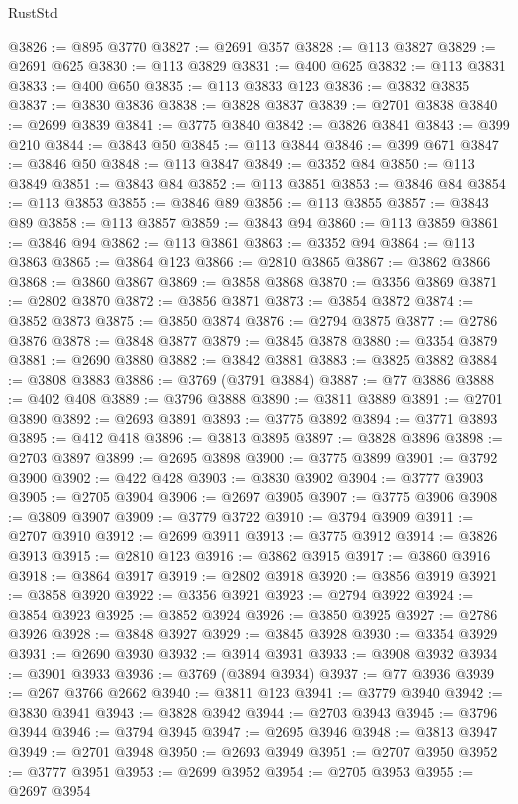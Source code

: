 \begin{lexlean}{RustStd}
\begin{coremodule}
@3826 := @895 @3770
@3827 := @2691 @357
@3828 := @113 @3827
@3829 := @2691 @625
@3830 := @113 @3829
@3831 := @400 @625
@3832 := @113 @3831
@3833 := @400 @650
@3835 := @113 @3833 @123
@3836 := @3832 @3835
@3837 := @3830 @3836
@3838 := @3828 @3837
@3839 := @2701 @3838
@3840 := @2699 @3839
@3841 := @3775 @3840
@3842 := @3826 @3841
@3843 := @399 @210
@3844 := @3843 @50
@3845 := @113 @3844
@3846 := @399 @671
@3847 := @3846 @50
@3848 := @113 @3847
@3849 := @3352 @84
@3850 := @113 @3849
@3851 := @3843 @84
@3852 := @113 @3851
@3853 := @3846 @84
@3854 := @113 @3853
@3855 := @3846 @89
@3856 := @113 @3855
@3857 := @3843 @89
@3858 := @113 @3857
@3859 := @3843 @94
@3860 := @113 @3859
@3861 := @3846 @94
@3862 := @113 @3861
@3863 := @3352 @94
@3864 := @113 @3863
@3865 := @3864 @123
@3866 := @2810 @3865
@3867 := @3862 @3866
@3868 := @3860 @3867
@3869 := @3858 @3868
@3870 := @3356 @3869
@3871 := @2802 @3870
@3872 := @3856 @3871
@3873 := @3854 @3872
@3874 := @3852 @3873
@3875 := @3850 @3874
@3876 := @2794 @3875
@3877 := @2786 @3876
@3878 := @3848 @3877
@3879 := @3845 @3878
@3880 := @3354 @3879
@3881 := @2690 @3880
@3882 := @3842 @3881
@3883 := @3825 @3882
@3884 := @3808 @3883
@3886 := @3769 (@3791 @3884)
@3887 := @77 @3886
@3888 := @402 @408
@3889 := @3796 @3888
@3890 := @3811 @3889
@3891 := @2701 @3890
@3892 := @2693 @3891
@3893 := @3775 @3892
@3894 := @3771 @3893
@3895 := @412 @418
@3896 := @3813 @3895
@3897 := @3828 @3896
@3898 := @2703 @3897
@3899 := @2695 @3898
@3900 := @3775 @3899
@3901 := @3792 @3900
@3902 := @422 @428
@3903 := @3830 @3902
@3904 := @3777 @3903
@3905 := @2705 @3904
@3906 := @2697 @3905
@3907 := @3775 @3906
@3908 := @3809 @3907
@3909 := @3779 @3722
@3910 := @3794 @3909
@3911 := @2707 @3910
@3912 := @2699 @3911
@3913 := @3775 @3912
@3914 := @3826 @3913
@3915 := @2810 @123
@3916 := @3862 @3915
@3917 := @3860 @3916
@3918 := @3864 @3917
@3919 := @2802 @3918
@3920 := @3856 @3919
@3921 := @3858 @3920
@3922 := @3356 @3921
@3923 := @2794 @3922
@3924 := @3854 @3923
@3925 := @3852 @3924
@3926 := @3850 @3925
@3927 := @2786 @3926
@3928 := @3848 @3927
@3929 := @3845 @3928
@3930 := @3354 @3929
@3931 := @2690 @3930
@3932 := @3914 @3931
@3933 := @3908 @3932
@3934 := @3901 @3933
@3936 := @3769 (@3894 @3934)
@3937 := @77 @3936
@3939 := @267 @3766 @2662
@3940 := @3811 @123
@3941 := @3779 @3940
@3942 := @3830 @3941
@3943 := @3828 @3942
@3944 := @2703 @3943
@3945 := @3796 @3944
@3946 := @3794 @3945
@3947 := @2695 @3946
@3948 := @3813 @3947
@3949 := @2701 @3948
@3950 := @2693 @3949
@3951 := @2707 @3950
@3952 := @3777 @3951
@3953 := @2699 @3952
@3954 := @2705 @3953
@3955 := @2697 @3954

\end{coremodule}
\end{lexlean}
